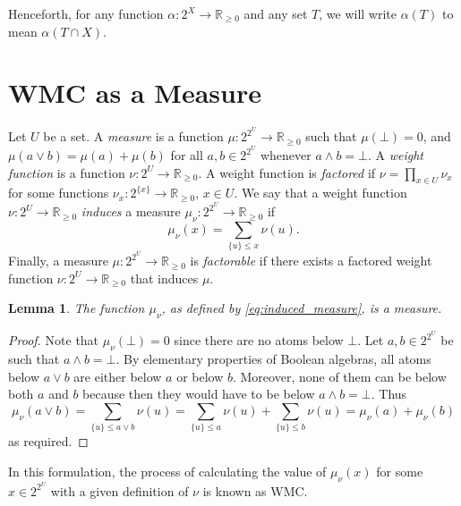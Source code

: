 \documentclass{article}
\newtheorem{lemma}{Lemma}
\theoremstyle{definition}
\theoremstyle{remark}
\begin{document}
{Henceforth, for any function $\alpha\colon 2^X \to \mathbb{R}_{\ge 0}$ and any
set $T$, we will write $\alpha(T)$ to mean $\alpha(T \cap X)$.

\section{WMC as a Measure}

Let $U$ be a set. A \emph{measure} is a function $\mu\colon 2^{2^U} \to
\mathbb{R}_{\ge 0}$ such that $\mu(\bot) = 0$, and $\mu(a \lor b) = \mu(a) +
\mu(b)$ for all $a, b \in 2^{2^U}$ whenever $a \land b = \bot$. A \emph{weight
  function} is a function $\nu\colon 2^U \to \mathbb{R}_{\ge 0}$. A weight
function is \emph{factored} if $\nu = \prod_{x \in U} \nu_x$ for some functions
$\nu_x\colon 2^{\{x\}} \to \mathbb{R}_{\ge 0}$, $x \in U$. We say that a weight
function $\nu\colon 2^U \to \mathbb{R}_{\ge 0}$ \emph{induces} a measure
$\mu_\nu\colon 2^{2^U} \to \mathbb{R}_{\ge 0}$ if
\begin{equation} \label{eq:induced_measure}
  \mu_\nu(x) = \sum_{\{u\} \le x} \nu(u).
\end{equation}
Finally, a measure $\mu\colon 2^{2^U} \to \mathbb{R}_{\ge 0}$ is
\emph{factorable} if there exists a factored weight function $\nu\colon 2^U \to
\mathbb{R}_{\ge 0}$ that induces $\mu$.

\begin{lemma} \label{prop:measure}
  The function $\mu_\nu$, as defined by \cref{eq:induced_measure}, is a measure.
\end{lemma}
\begin{proof}
  Note that $\mu_\nu(\bot) = 0$ since there are no atoms below $\bot$. Let $a, b
  \in 2^{2^{U}}$ be such that $a \land b = \bot$. By elementary properties of
  Boolean algebras, all atoms below $a \lor b$ are either below $a$ or below
  $b$. Moreover, none of them can be below both $a$ and $b$ because then they
  would have to be below $a \land b = \bot$. Thus
  \[
    \mu_\nu(a \lor b) = \sum_{\{u\} \le a \lor b} \nu(u) = \sum_{\{u\} \le a}
    \nu(u) + \sum_{\{u\} \le b} \nu(u) = \mu_\nu(a) + \mu_\nu(b)
  \]
  as required.
\end{proof}

In this formulation, the process of calculating the value of $\mu_\nu(x)$ for
some $x \in 2^{2^U}$ with a given definition of $\nu$ is known as WMC.

}
\end{document}

